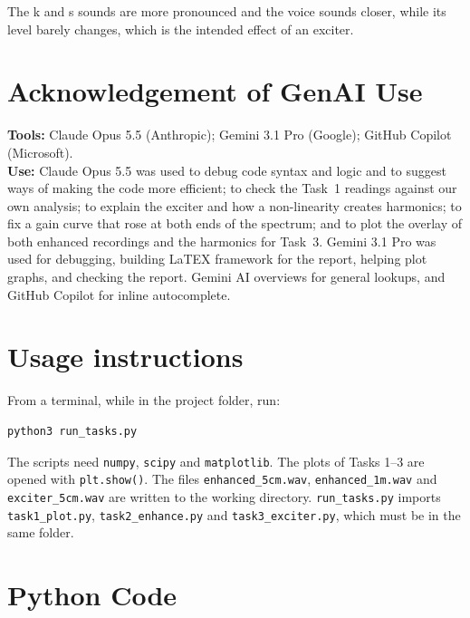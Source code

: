\documentclass[11pt,a4paper]{article}
\begin{document}
The k and s sounds are more pronounced and the voice sounds closer, while its level barely changes, which is the intended effect of an exciter.

\pagebreak
\appendix

\section{Acknowledgement of GenAI Use}
\textbf{Tools:}
Claude Opus 5.5 (Anthropic);
Gemini 3.1 Pro (Google);
GitHub Copilot (Microsoft).\\
\textbf{Use:}
Claude Opus 5.5 was used to debug code syntax and logic and to suggest ways of making the code more efficient; to check the Task~1 readings against our own analysis; to explain the exciter and how a non-linearity creates harmonics; to fix a gain curve that rose at both ends of the spectrum; and to plot the overlay of both enhanced recordings and the harmonics for Task~3.
Gemini 3.1 Pro was used for debugging, building LaTEX framework for the report, helping plot graphs, and checking the report.
Gemini AI overviews for general lookups, and GitHub Copilot for inline autocomplete.\\

\section{Usage instructions}
From a terminal, while in the project folder, run:
\begin{verbatim}
python3 run_tasks.py
\end{verbatim}
The scripts need \texttt{numpy}, \texttt{scipy} and \texttt{matplotlib}.
The plots of Tasks 1--3 are opened with \texttt{plt.show()}.
The files \texttt{enhanced\_5cm.wav}, \texttt{enhanced\_1m.wav} and \texttt{exciter\_5cm.wav} are written to the working directory.
\texttt{run\_tasks.py} imports \texttt{task1\_plot.py}, \texttt{task2\_enhance.py} and \texttt{task3\_exciter.py}, which must be in the same folder.

\section{Python Code}
\end{document}
